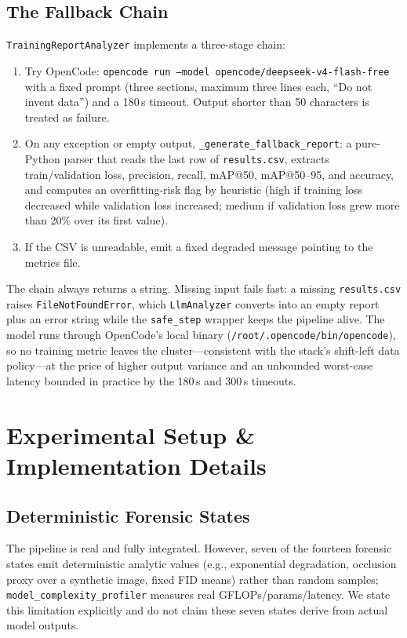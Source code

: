 \documentclass[10pt,twocolumn,letterpaper]{article}
\begin{document}
\subsection{The Fallback Chain}
\texttt{TrainingReportAnalyzer} implements a three-stage chain:
\begin{enumerate}
    \item Try OpenCode: \texttt{opencode run --model opencode/deepseek-v4-flash-free} with a fixed prompt (three sections, maximum three lines each, ``Do not invent data'') and a 180\,s timeout. Output shorter than 50 characters is treated as failure.
    \item On any exception or empty output, \texttt{\_generate\_fallback\_report}: a pure-Python parser that reads the last row of \texttt{results.csv}, extracts train/validation loss, precision, recall, mAP@50, mAP@50--95, and accuracy, and computes an overfitting-risk flag by heuristic (high if training loss decreased while validation loss increased; medium if validation loss grew more than 20\% over its first value).
    \item If the CSV is unreadable, emit a fixed degraded message pointing to the metrics file.
\end{enumerate}
The chain always returns a string. Missing input fails fast: a missing \texttt{results.csv} raises \texttt{FileNotFoundError}, which \texttt{LlmAnalyzer} converts into an empty report plus an error string while the \texttt{safe\_step} wrapper keeps the pipeline alive. The model runs through OpenCode's local binary (\texttt{/root/.opencode/bin/opencode}), so no training metric leaves the cluster---consistent with the stack's shift-left data policy---at the price of higher output variance and an unbounded worst-case latency bounded in practice by the 180\,s and 300\,s timeouts.

\section{Experimental Setup \& Implementation Details}
\subsection{Deterministic Forensic States}
The pipeline is real and fully integrated. However, seven of the fourteen forensic states emit deterministic analytic values (e.g., exponential degradation, occlusion proxy over a synthetic image, fixed FID means) rather than random samples; \texttt{model\_complexity\_profiler} measures real GFLOPs/params/latency. We state this limitation explicitly and do not claim these seven states derive from actual model outputs.
\end{document}
